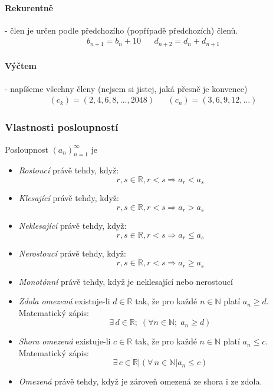 \documentclass[12pt]{article}
\begin{document}
\paragraph{Rekurentně} - člen je určen podle předchozího (popřípadě předchozích) členů.
\begin{align}
b_{n+1} = b_n + 10 && d_{n+2} = d_{n} + d_{n+1}
\end{align}
\paragraph{Výčtem} - napíšeme všechny členy (nejsem si jistej, jaká přesně je konvence)
\begin{align}
 (c_k) = \left( 2,4,6,8, \dotsc, 2048\right) && (c_n) = \left( 3,6,9,12, \dotsc \right)
\end{align}
\subsubsection{Vlastnosti posloupností}
Posloupnost $\left( a_n \right)_{n=1}^{\infty}$ je
\begin{itemize}
\item \emph{Rostoucí} právě tehdy, když:
\begin{equation}
r,s \in \mathbb{R}, r<s \Rightarrow a_r < a_s
\end{equation}
\item \emph{Klesající} právě tehdy, když:
\begin{equation}
r,s \in \mathbb{R}, r<s \Rightarrow a_r > a_s
\end{equation}
\item \emph{Neklesající} právě tehdy, když:
\begin{equation}
r,s \in \mathbb{R}, r<s \Rightarrow a_r \leq a_s
\end{equation}
\item \emph{Nerostoucí} právě tehdy, když:
\begin{equation}
r,s \in \mathbb{R}, r<s \Rightarrow a_r \geq a_s
\end{equation}
\item \emph{Monotónní} právě tehdy, když je neklesající nebo nerostoucí
\item \emph{Zdola omezená} existuje-li $d \in \mathbb{R}$ tak, že pro každé $ n \in \mathbb{N}$ platí $a_n \geq d$. Matematický zápis:
\begin{equation}
\exists \, d \in \mathbb{R}; \; \left( \forall n \in \mathbb{N}; \; a_n \geq d \right)
\end{equation}
\item \emph{Shora omezená} existuje-li $c \in \mathbb{R}$ tak, že pro každé $ n \in \mathbb{N}$ platí $a_n \leq c$. Matematický zápis:
\begin{equation}
\exists \, c \in \mathbb{R} | \left( \forall \, n \in \mathbb{N} | a_n \leq c \right)
\end{equation}
\item \emph{Omezená} právě tehdy, když je zároveň omezená ze shora i ze zdola.
\end{itemize}
\end{document}
